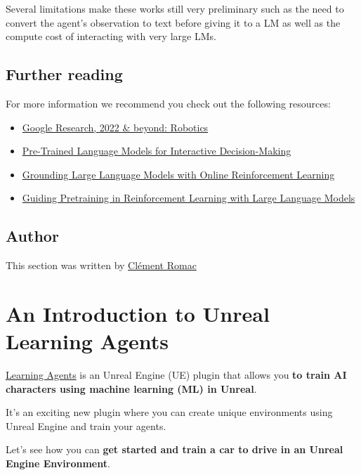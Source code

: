 \documentclass[11pt,a4paper]{article}
\begin{document}
Several limitations make these works still very preliminary such as the need to convert the agent's observation to text before giving it to a LM as well as the compute cost of interacting with very large LMs.

\subsection{Further reading}\label{further-reading-4}

For more information we recommend you check out the following resources:

\begin{itemize}
\item
  \href{https://ai.googleblog.com/2023/02/google-research-2022-beyond-robotics.html}{Google Research, 2022 \& beyond: Robotics}
\item
  \href{https://arxiv.org/abs/2202.01771}{Pre-Trained Language Models for Interactive Decision-Making}
\item
  \href{https://arxiv.org/abs/2302.02662v1}{Grounding Large Language Models with Online Reinforcement Learning}
\item
  \href{https://arxiv.org/abs/2302.06692}{Guiding Pretraining in Reinforcement Learning with Large Language Models}
\end{itemize}

\subsection{Author}\label{author-5}

This section was written by \href{https://twitter.com/ClementRomac}{Clément Romac}

\section{An Introduction to Unreal Learning Agents}\label{an-introduction-to-unreal-learning-agents}

\href{https://dev.epicgames.com/community/learning/tutorials/8OWY/unreal-engine-learning-agents-introduction}{Learning Agents} is an Unreal Engine (UE) plugin that allows you \textbf{to train AI characters using machine learning (ML) in Unreal}.

It's an exciting new plugin where you can create unique environments using Unreal Engine and train your agents.

Let's see how you can \textbf{get started and train a car to drive in an Unreal Engine Environment}.
\end{document}
